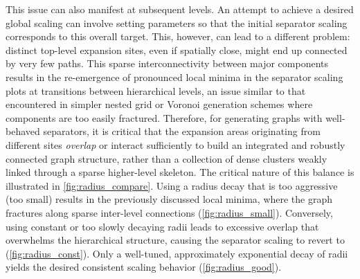 This issue can also manifest at subsequent levels.
An attempt to achieve a desired global  scaling can involve setting parameters so that the initial  separator scaling corresponds to this overall target.
This, however, can lead to a different problem: distinct top-level expansion sites, even if spatially close, might end up connected by very few paths.
This sparse interconnectivity between major components results in the re-emergence of pronounced local minima in the separator scaling plots at transitions between hierarchical levels, an issue similar to that encountered in simpler nested grid or Voronoi generation schemes where components are too easily fractured.
Therefore, for generating graphs with well-behaved separators, it is critical that the expansion areas originating from different sites \emph{overlap} or interact sufficiently to build an integrated and robustly connected graph structure, rather than a collection of dense clusters weakly linked through a sparse higher-level skeleton.
The critical nature of this balance is illustrated in \cref{fig:radius_compare}.
Using a radius decay that is too aggressive (too small) results in the previously discussed local minima, where the graph fractures along sparse inter-level connections (\cref{fig:radius_small}).
Conversely, using constant or too slowly decaying radii leads to excessive overlap that overwhelms the hierarchical structure, causing the separator scaling to revert to  (\cref{fig:radius_const}).
Only a well-tuned, approximately exponential decay of radii yields the desired consistent scaling behavior (\cref{fig:radius_good}).

